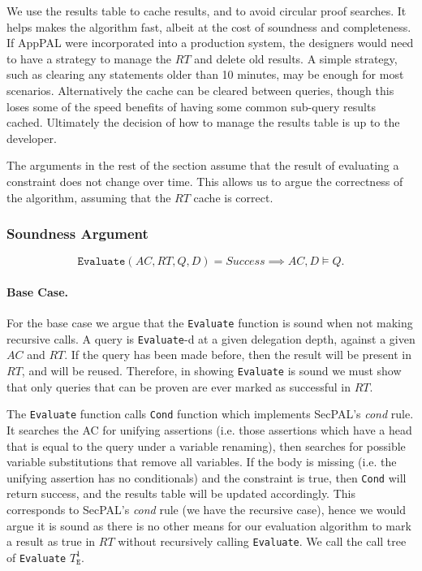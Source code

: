 \documentclass[thesis.tex]{subfiles}
\begin{document}
We use the results table to cache results, and to avoid circular proof searches.
It helps makes the algorithm fast, albeit at the cost of soundness and
completeness. If AppPAL were incorporated into a production system, the
designers would need to have a strategy to manage the $RT$ and delete old
results. A simple strategy, such as clearing any statements older than 10
minutes, may be enough for most scenarios.  Alternatively the cache can be cleared between queries, though this loses some of the speed benefits of having some common sub-query results cached.  Ultimately the decision of how to manage the results table is up to the developer.

The arguments in the rest of the section assume that the result of evaluating a
constraint does not change over time. This allows us to argue the
correctness of the algorithm, assuming that the $RT$ cache is correct.

\subsubsection*{Soundness Argument}

\begin{equation*}
  \mathtt{Evaluate}(AC, RT, Q, D) = \textit{Success} \implies
  AC, D \models Q.
\end{equation*}



\paragraph*{Base Case.} For the base case we argue that the
\texttt{Evaluate} function is sound when not making recursive calls.
A query is \texttt{Evaluate}-d at a given delegation depth, against a
given $AC$ and $RT$. If the query has been made before, then the
result will be present in $RT$, and will be reused. Therefore, in
showing \texttt{Evaluate} is sound we must show that only queries that
can be proven are ever marked as successful in $RT$.

The \texttt{Evaluate} function calls \texttt{Cond} function which
implements SecPAL's \emph{cond} rule.  It searches the AC for unifying
assertions (i.e. those assertions which have a head that is equal to
the query under a variable renaming), then searches for possible
variable substitutions that remove all variables. If the body is missing
(i.e. the unifying assertion has no conditionals) and the constraint
is true, then \texttt{Cond} will return success, and the results table
will be updated accordingly.  This corresponds to SecPAL's \emph{cond}
rule (we have  the recursive case), hence we would
argue it is sound as there is no other means for our evaluation
algorithm to mark a result as true in $RT$ without recursively calling
\texttt{Evaluate}.  We call the call tree of \texttt{Evaluate} $T_{\mathtt{E}}^1$.
\end{document}
